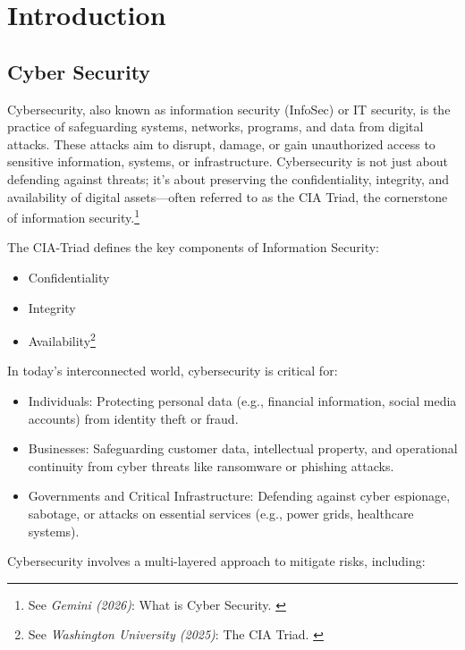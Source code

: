 %
%

\pagebreak
\section{Introduction}

\onehalfspacing

\subsection{Cyber Security}

Cybersecurity, also known as information security (InfoSec) or IT security, is the practice of safeguarding systems, networks, programs, and data from digital attacks. These attacks aim to disrupt, damage, or gain unauthorized access to sensitive information, systems, or infrastructure. Cybersecurity is not just about defending against threats; it's about preserving the confidentiality, integrity, and availability of digital assets—often referred to as the CIA Triad, the cornerstone of information security.\footnote{See \textit{Gemini (2026)}: What is Cyber Security. \cite{bardCybersec}}

The CIA-Triad defines the key components of Information Security:

\begin{itemize}
    \item Confidentiality
    \item Integrity
    \item Availability\footnote{See \textit{Washington University (2025)}: The CIA Triad. \cite{ciaTriad}} 
\end{itemize}

In today's interconnected world, cybersecurity is critical for:

\begin{itemize}
    \item Individuals: Protecting personal data (e.g., financial information, social media accounts) from identity theft or fraud.
    \item Businesses: Safeguarding customer data, intellectual property, and operational continuity from cyber threats like ransomware or phishing attacks.
    \item Governments and Critical Infrastructure: Defending against cyber espionage, sabotage, or attacks on essential services (e.g., power grids, healthcare systems).
\end{itemize}

Cybersecurity involves a multi-layered approach to mitigate risks, including:

